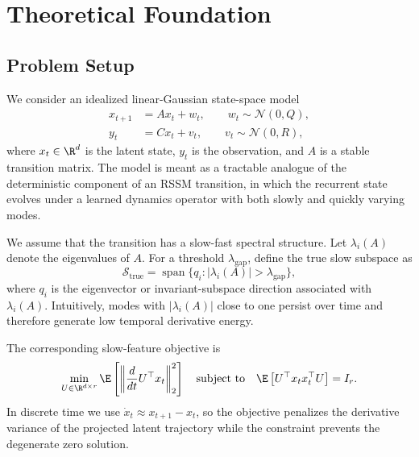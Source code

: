 
\section{Theoretical Foundation}

\subsection{Problem Setup}

We consider an idealized linear-Gaussian state-space model
\begin{align}
    x_{t+1} &= A x_t + w_t, \qquad w_t \sim \mathcal{N}(0, Q), \\
    y_t &= C x_t + v_t, \qquad v_t \sim \mathcal{N}(0, R),
\end{align}
where $x_t \in \R^d$ is the latent state, $y_t$ is the observation, and $A$
is a stable transition matrix. The model is meant as a tractable analogue of
the deterministic component of an RSSM transition, in which the recurrent state
evolves under a learned dynamics operator with both slowly and quickly varying
modes.

We assume that the transition has a slow-fast spectral structure. Let
$\lambda_i(A)$ denote the eigenvalues of $A$. For a threshold
$\lambda_{\mathrm{gap}}$, define the true slow subspace as
\begin{equation}
    \mathcal{S}_{\mathrm{true}}
    =
    \operatorname{span}\{q_i : |\lambda_i(A)| > \lambda_{\mathrm{gap}}\},
\end{equation}
where $q_i$ is the eigenvector or invariant-subspace direction associated with
$\lambda_i(A)$. Intuitively, modes with $|\lambda_i(A)|$ close to one persist
over time and therefore generate low temporal derivative energy.

The corresponding slow-feature objective is
\begin{equation}
    \min_{U \in \R^{d \times r}}
    \E\left[\left\|\frac{d}{dt} U^\top x_t\right\|_2^2\right]
    \quad
    \text{subject to}
    \quad
    \E\left[U^\top x_t x_t^\top U\right] = I_r.
    \label{eq:slow_feature_objective}
\end{equation}
In discrete time we use $\dot{x}_t \approx x_{t+1} - x_t$, so the objective
penalizes the derivative variance of the projected latent trajectory while the
constraint prevents the degenerate zero solution.

